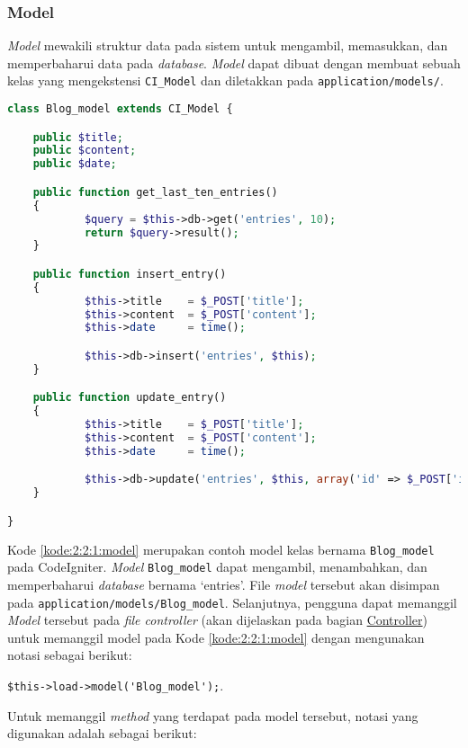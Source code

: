 \subsubsection{Model}
\label{sub:2:2:1:model}

\textit{Model} mewakili struktur data pada sistem untuk mengambil, memasukkan, dan memperbaharui data pada \textit{database}. \textit{Model} dapat dibuat dengan membuat sebuah kelas yang mengekstensi \verb|CI_Model| dan diletakkan pada \verb|application/models/|.

\begin{lstlisting}[language=php, caption=Contoh \textit{model}, label=kode:2:2:1:model]
class Blog_model extends CI_Model {

	public $title;
	public $content;
	public $date;

	public function get_last_ten_entries()
	{
			$query = $this->db->get('entries', 10);
			return $query->result();
	}

	public function insert_entry()
	{
			$this->title    = $_POST['title'];
			$this->content  = $_POST['content'];
			$this->date     = time();

			$this->db->insert('entries', $this);
	}

	public function update_entry()
	{
			$this->title    = $_POST['title'];
			$this->content  = $_POST['content'];
			$this->date     = time();

			$this->db->update('entries', $this, array('id' => $_POST['id']));
	}

}
\end{lstlisting}

Kode \ref{kode:2:2:1:model} merupakan contoh model kelas bernama \verb|Blog_model| pada CodeIgniter. \textit{Model} \verb|Blog_model| dapat mengambil, menambahkan, dan memperbaharui \textit{database} bernama `entries'. File \textit{model} tersebut akan disimpan pada \verb|application/models/Blog_model|. Selanjutnya, pengguna dapat memanggil \textit{Model} tersebut pada \textit{file controller} (akan dijelaskan pada bagian \hyperref[sub:2:2:3:Controller]{Controller}) untuk memanggil model pada Kode \ref{kode:2:2:1:model} dengan mengunakan notasi sebagai berikut:

\begin{center}
	\verb|$this->load->model('Blog_model');|.
\end{center}

Untuk memanggil \textit{method} yang terdapat pada model tersebut, notasi yang digunakan adalah sebagai berikut:


